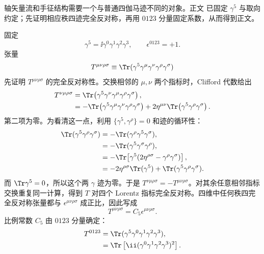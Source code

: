 \begin{derivation}

轴矢量流和手征结构需要一个与普通四伽马迹不同的对象。正文 已固定 $\gamma^5$ 与取向约定；先证明相应秩四迹完全反对称，再用 $0123$ 分量固定系数，从而得到正文。



固定
\begin{equation*}
 \gamma^5=\ii\gamma^0\gamma^1\gamma^2\gamma^3,
 \qquad \epsilon^{0123}=+1.
\end{equation*}
张量
\begin{equation*}
 T^{\mu\nu\rho\sigma}
 \equiv\Tr(\gamma^5\gamma^\mu\gamma^\nu\gamma^\rho\gamma^\sigma)
\end{equation*}
先证明 $T^{\mu\nu\rho\sigma}$ 的完全反对称性。交换相邻的 $\mu,\nu$ 两个指标时，Clifford 代数给出
\begin{align*}
T^{\nu\mu\rho\sigma}
&=\Tr\!\left(\gamma^5\gamma^\nu\gamma^\mu\gamma^\rho\gamma^\sigma\right),\\
&=-\Tr\!\left(\gamma^5\gamma^\mu\gamma^\nu\gamma^\rho\gamma^\sigma\right)
+2\eta^{\mu\nu}\Tr\!\left(\gamma^5\gamma^\rho\gamma^\sigma\right).
\end{align*}
第二项为零。为看清这一点，利用 $\{\gamma^5,\gamma^\rho\}=0$ 和迹的循环性：
\begin{align*}
\Tr(\gamma^5\gamma^\rho\gamma^\sigma)
&=-\Tr(\gamma^\rho\gamma^5\gamma^\sigma),\\
&=-\Tr(\gamma^5\gamma^\sigma\gamma^\rho),\\
&=-\Tr\!\left[\gamma^5(2\eta^{\rho\sigma}-\gamma^\rho\gamma^\sigma)\right],\\
&=-2\eta^{\rho\sigma}\Tr(\gamma^5)+\Tr(\gamma^5\gamma^\rho\gamma^\sigma).
\end{align*}
而 $\Tr\gamma^5=0$，所以这个两 $\gamma$ 迹为零。于是
$T^{\nu\mu\rho\sigma}=-T^{\mu\nu\rho\sigma}$。对其余任意相邻指标交换重复同一计算，得到 $T$ 对四个 Lorentz 指标完全反对称。四维中任何秩四完全反对称张量都与 $\epsilon^{\mu\nu\rho\sigma}$ 成正比，因此写成
\begin{equation*}
T^{\mu\nu\rho\sigma}=C_5\epsilon^{\mu\nu\rho\sigma}.
\end{equation*}
比例常数 $C_5$ 由 $0123$ 分量确定：
\begin{align*}
 T^{0123}
 &=\Tr(\gamma^5\gamma^0\gamma^1\gamma^2\gamma^3),\\
 &=\Tr\left[
 \ii(\gamma^0\gamma^1\gamma^2\gamma^3)^2
 \right].

\end{align*}
\end{derivation}
